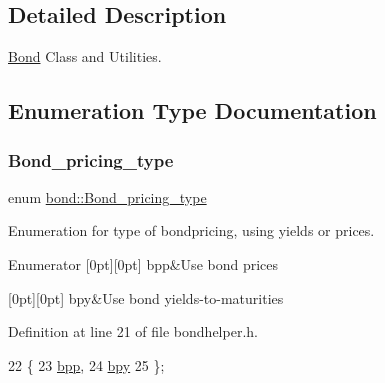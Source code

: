 \subsection{Detailed Description}
\hyperlink{classbond_1_1_bond}{Bond} Class and Utilities. 

\subsection{Enumeration Type Documentation}
\mbox{\label{namespacebond_a7ff8132c72465682a65a634ca0958df9}} 
\subsubsection{\texorpdfstring{Bond\+\_\+pricing\+\_\+type}{Bond\_pricing\_type}}
{\footnotesize\ttfamily enum \hyperlink{namespacebond_a7ff8132c72465682a65a634ca0958df9}{bond\+::\+Bond\+\_\+pricing\+\_\+type}\hspace{0.3cm}{\ttfamily [strong]}}



Enumeration for type of bondpricing, using yields or prices. 

\begin{DoxyEnumFields}{Enumerator}
[0pt][0pt]{}\mbox{\label{namespacebond_a7ff8132c72465682a65a634ca0958df9a0c68c2daa0334704116676287d54c2ae}} 
bpp&Use bond prices \\
\hline

[0pt][0pt]{}\mbox{\label{namespacebond_a7ff8132c72465682a65a634ca0958df9afebbcc7d14e1ada7b0eee6411e82665b}} 
bpy&Use bond yields-\/to-\/maturities \\
\hline

\end{DoxyEnumFields}


Definition at line 21 of file bondhelper.\+h.


\begin{DoxyCode}
22     \{ 
23         \hyperlink{namespacebond_a7ff8132c72465682a65a634ca0958df9a0c68c2daa0334704116676287d54c2ae}{bpp}, 
24         \hyperlink{namespacebond_a7ff8132c72465682a65a634ca0958df9afebbcc7d14e1ada7b0eee6411e82665b}{bpy} 
25     \};
\end{DoxyCode}


